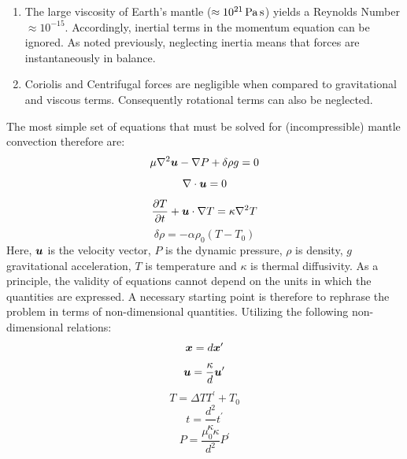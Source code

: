 \begin{enumerate}
\item The large viscosity of Earth's mantle ($\approx\unit[10^{21}]{Pa}\,\mathrm{s}$) yields a Reynolds Number $\approx 10^{-15}$. Accordingly, inertial terms in the momentum equation can be ignored. As noted previously, neglecting inertia means that forces are instantaneously in balance.
\item Coriolis and Centrifugal forces are negligible when compared to gravitational and viscous terms. Consequently rotational terms can also be neglected. 
\end{enumerate}

The most simple set of equations that must be solved for (incompressible) mantle convection therefore are:
\begin{equation*}
 \mu \nabla^{2}{\mbox{\boldmath$u$}} - \nabla P + \delta \rho g = 0 
\end{equation*}
\begin{equation*}
 \nabla \cdot {\mbox{\boldmath$u$}} = 0
\end{equation*}
\begin{equation*}
 \frac{\partial T}{\partial t} + {\mbox{\boldmath$u$}} \cdot \nabla T = \kappa \nabla^{2} T 
\end{equation*}
\begin{equation*}
  \delta \rho = - \alpha \rho_{0} (T - T_{0})
\end{equation*}
Here, ${\mbox{\boldmath$u$}}$ is the velocity vector, $P$ is the dynamic pressure, $\rho$ is density, $g$ gravitational acceleration, $T$ is temperature and $\kappa$ is thermal diffusivity. As a principle, the validity of equations cannot depend on the units in which the quantities are expressed. A necessary starting point is therefore to rephrase the problem in terms of non-dimensional quantities. Utilizing the following non-dimensional relations:
\begin{equation*}
{\mbox{\boldmath$x$}} = d {\mbox{\boldmath$x$}}^\prime
\end{equation*}
\begin{equation*}
{\mbox{\boldmath$u$}} = \frac{\kappa}{d} {\mbox{\boldmath$u$}}^\prime
\end{equation*}
\begin{equation*}
T = \Delta T T^\prime + T_{0}
\end{equation*}
\begin{equation*}
t = \frac{d^{2}}{\kappa} t^\prime
\end{equation*}
\begin{equation*}
P = \frac{\mu_{0} \kappa}{d^{2}} P^\prime
\end{equation*}
